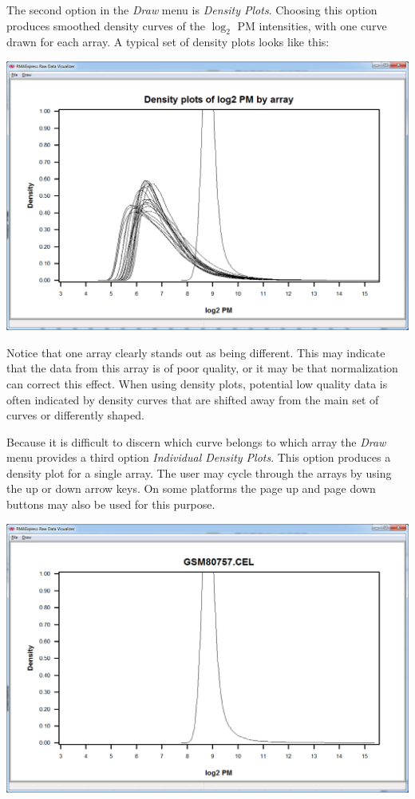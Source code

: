 \documentclass[11pt]{report}
\begin{document}
\clearpage
The second option in the {\it Draw} menu is {\it Density Plots}. Choosing this option produces smoothed density curves of the $\log_2$ PM intensities,  with one curve drawn for each array. A typical set of density plots looks like this:
\begin{center}
\includegraphics[scale=0.4]{rawdatavisualizedensity.png}
\end{center}
Notice that one array clearly stands out as being different. This may indicate that the data from this array is of poor quality, or it may be that normalization can correct this effect. When using density plots, potential low quality data is often indicated by density curves that are shifted away from the main set of curves or differently shaped.

\clearpage
Because it is difficult to discern which curve belongs to which array the {\it Draw} menu provides a third option {\it Individual Density Plots}. This option produces a density plot for a single array. The user may cycle through the arrays by using the up or down arrow keys. On some platforms the page up and page down buttons may also be used for this purpose.
\begin{center}
\includegraphics[scale=0.4]{rawdatavisualizedensityindividual.png}
\end{center}
\end{document}
